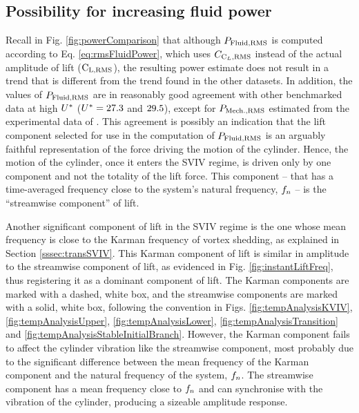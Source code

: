 \documentclass[oneside]{utmthesis}
\begin{document}
\subsection{Possibility for increasing fluid power} \label{ssec:possIncrease}

Recall in Fig. \ref{fig:powerComparison} that although $P_{\text{Fluid,RMS}}$ is computed according to Eq. \ref{eq:rmsFluidPower}, which uses $C_{\text{C}_{L},\text{RMS}}$ instead of the actual \rms{} amplitude of lift ($\text{C}_{\text{L,RMS}}$), the resulting power estimate does not result in a trend that is different from the trend found in the other datasets. In addition, the values of $P_{\text{Fluid,RMS}}$ are in reasonably good agreement with other benchmarked data at high $U^{*}$ ($U^{*} = 27.3$ and $29.5$), except for $P_{\text{Mech.,RMS}}$ estimated from the experimental data of \citet{Nguyen2012}. This agreement is possibly an indication that the lift component selected for use in the computation of $P_{\text{Fluid,RMS}}$ is an arguably faithful representation of the force driving the motion of the cylinder. Hence, the motion of the cylinder, once it enters the SVIV regime, is driven only by one component and not the totality of the lift force. This component -- that has a time-averaged frequency close to the system's natural frequency, $f_{n}$ -- is the ``streamwise component'' of lift.

Another significant component of lift in the SVIV regime is the one whose mean frequency is close to the Karman frequency of vortex shedding, as explained in Section \ref{sssec:transSVIV}. This Karman component of lift is similar in amplitude to the streamwise component of lift, as evidenced in Fig. \ref{fig:instantLiftFreq}, thus registering it as a dominant component of lift. The Karman components are marked with a dashed, white box, and the streamwise components are marked with a solid, white box, following the convention in Figs. \ref{fig:tempAnalysisKVIV}, \ref{fig:tempAnalysisUpper}, \ref{fig:tempAnalysisLower}, \ref{fig:tempAnalysisTransition} and \ref{fig:tempAnalysisStableInitialBranch}. However, the Karman component fails to affect the cylinder vibration like the streamwise component, most probably due to the significant difference between the mean frequency of the Karman component and the natural frequency of the system, $f_{n}$.  The streamwise component has a mean frequency close to $f_{n}$ and can synchronise with the vibration of the cylinder, producing a sizeable amplitude response.
\end{document}
